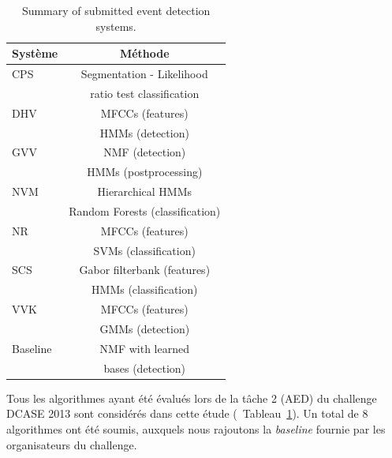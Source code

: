 \begin{table}[t]
\begin{center}
\begin{tabular}{lc}
\textbf{Système}  & \textbf{Méthode}  \\ 
\hline
CPS \hfill \citep{CPS}                        & Segmentation - Likelihood \\ 
                                              & ratio test classification  \\ 
\hline        
DHV \hfill \citep{diment2013sound,DHV}        & MFCCs (features)      \\ 
                                              & HMMs (detection)      \\
\hline 
GVV \hfill \citep{gemmeke2013exemplar,GVV}    & NMF (detection)       \\
                                              & HMMs (postprocessing) \\
\hline
NVM \hfill \citep{roma2013recurrence}         & Hierarchical HMMs               \\     
\hfill \citep{NVM}                            & Random Forests (classification) \\    
\hline
NR \hfill \citep{niessen2013hierarchical,NR2} & MFCCs (features)  \\
                                              & SVMs (classification) \\
\hline
SCS \hfill \citep{schroder2013use,SCS}        & Gabor filterbank (features) \\  
                                              & HMMs (classification) \\    
\hline  
VVK \hfill \citep{VVK}                        & MFCCs (features)  \\ 
\hfill \citep{gemmeke2013exemplar}            & GMMs (detection)  \\ 
\hline
Baseline \hfill \citep{Giannoulis:2013a}      & NMF with learned  \\ 
                                              & bases (detection) \\ 
\hline      
\end{tabular}
\end{center}
\caption{Summary of submitted event detection systems.}
\label{tab:systems}
\end{table}

Tous les algorithmes ayant été évalués lors de la tâche 2 (AED) du challenge DCASE 2013 sont considérés dans cette étude (\cf~Tableau~\ref{tab:systems}). Un total de 8 algorithmes ont été soumis, auxquels nous rajoutons la \emph{baseline} fournie par les organisateurs du challenge.


